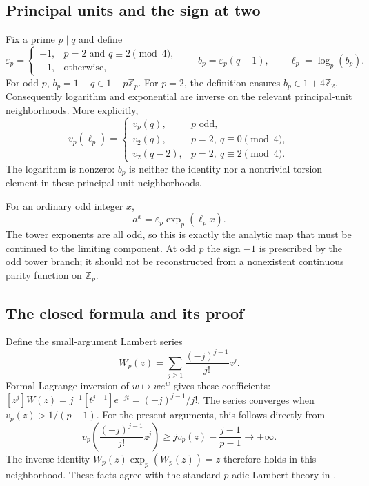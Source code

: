 \documentclass[11pt,a4paper]{article}
\numberwithin{equation}{section}
\theoremstyle{plain}
\theoremstyle{definition}
\newcommand{\Z}{\mathbb Z}
\newcommand{\eps}{\varepsilon}
\begin{document}
\subsection{Principal units and the sign at two}
Fix a prime $p\mid q$ and define
\begin{equation}\label{eq:epsilon}
 \eps_p=
 \begin{cases}
 +1,&p=2\text{ and }q\equiv2\pmod4,\\
 -1,&\text{otherwise},
 \end{cases}
 \qquad b_p=\eps_p(q-1),\qquad \ell_p=\log_p(b_p).
\end{equation}
For odd $p$, $b_p=1-q\in1+p\Z_p$.
For $p=2$, the definition ensures $b_p\in1+4\Z_2$.
Consequently logarithm and exponential are inverse on the relevant
principal-unit neighborhoods.  More explicitly,
\[
 v_p(\ell_p)=
 \begin{cases}
 v_p(q),&p\text{ odd},\\
 v_2(q),&p=2,\ q\equiv0\pmod4,\\
 v_2(q-2),&p=2,\ q\equiv2\pmod4.
 \end{cases}
\]
The logarithm is nonzero: $b_p$ is neither the identity nor a
nontrivial torsion element in these principal-unit neighborhoods.

For an ordinary odd integer $x$,
\begin{equation}\label{eq:localmap}
 a^x=\eps_p\exp_p(\ell_p x).
\end{equation}
The tower exponents are all odd, so this is exactly the analytic map
that must be continued to the limiting component.  At odd $p$ the sign
$-1$ is prescribed by the odd tower branch; it should not be reconstructed
from a nonexistent continuous parity function on $\Z_p$.

\subsection{The closed formula and its proof}
Define the small-argument Lambert series
\begin{equation}\label{eq:Wseries}
 W_p(z)=\sum_{j\ge1}\frac{(-j)^{j-1}}{j!}z^j.
\end{equation}
Formal Lagrange inversion of $w\mapsto we^w$ gives these coefficients:
$[z^j]W(z)=j^{-1}[t^{j-1}]e^{-jt}=(-j)^{j-1}/j!$.
The series converges when $v_p(z)>1/(p-1)$.  For the present arguments,
this follows directly from
\[
 v_p\!\left(\frac{(-j)^{j-1}}{j!}z^j\right)
 \ge jv_p(z)-\frac{j-1}{p-1}\longrightarrow+\infty.
\]
The inverse identity $W_p(z)\exp_p(W_p(z))=z$ therefore holds in
this neighborhood.  These facts agree with the standard $p$-adic
Lambert theory in \cite{mezo}.
\end{document}
